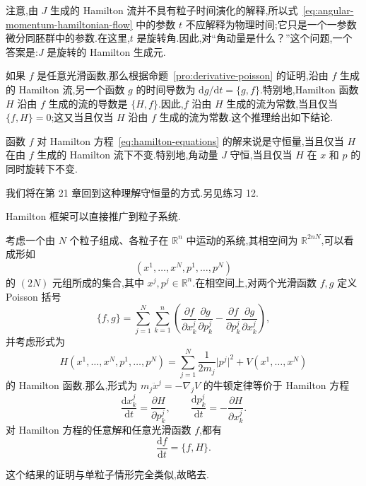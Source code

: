 注意,由 $J$ 生成的 Hamilton 流并不具有粒子时间演化的解释,所以式~\eqref{eq:angular-momentum-hamiltonian-flow} 中的参数 $t$ 不应解释为物理时间;它只是一个一参数微分同胚群中的参数.在这里,$t$ 是旋转角.因此,对“角动量是什么？”这个问题,一个答案是:$J$ 是旋转的 Hamilton 生成元.

如果 $f$ 是任意光滑函数,那么根据命题~\ref{pro:derivative-poisson} 的证明,沿由 $f$ 生成的 Hamilton 流,另一个函数 $g$ 的时间导数为 $\mathrm{d}g/\mathrm{d}t=\{g,f\}$.特别地,Hamilton 函数 $H$ 沿由 $f$ 生成的流的导数是 $\{H,f\}$.因此,$f$ 沿由 $H$ 生成的流为常数,当且仅当 $\{f,H\}=0$;这又当且仅当 $H$ 沿由 $f$ 生成的流为常数.这个推理给出如下结论.

\begin{conclusion}
函数 $f$ 对 Hamilton 方程~\eqref{eq:hamilton-equations} 的解来说是守恒量,当且仅当 $H$ 在由 $f$ 生成的 Hamilton 流下不变.特别地,角动量 $J$ 守恒,当且仅当 $H$ 在 $x$ 和 $p$ 的同时旋转下不变.
\end{conclusion}

我们将在第 21 章回到这种理解守恒量的方式.另见练习 12.

Hamilton 框架可以直接推广到粒子系统.

\begin{proposition}\label{pro:many-particle-hamiltonian}
考虑一个由 $N$ 个粒子组成、各粒子在 $\mathbb{R}^{n}$ 中运动的系统,其相空间为 $\mathbb{R}^{2nN}$,可以看成形如
\[
  (x^{1},\ldots,x^{N},p^{1},\ldots,p^{N})
\]
的 $(2N)$ 元组所成的集合,其中 $x^{j},p^{j}\in\mathbb{R}^{n}$.在相空间上,对两个光滑函数 $f,g$ 定义 Poisson 括号
\[
  \{f,g\}=\sum_{j=1}^{N}\sum_{k=1}^{n}\left(
  \frac{\partial f}{\partial x^{j}_{k}}\frac{\partial g}{\partial p^{j}_{k}}
  -\frac{\partial f}{\partial p^{j}_{k}}\frac{\partial g}{\partial x^{j}_{k}}\right),
\]
并考虑形式为
\[
  H(x^{1},\ldots,x^{N},p^{1},\ldots,p^{N})
  =\sum_{j=1}^{N}\frac{1}{2m_{j}}\lvert p^{j}\rvert^{2}+V(x^{1},\ldots,x^{N})
\]
的 Hamilton 函数.那么,形式为 $m_{j}\ddot{x}^{j}=-\nabla_{j}V$ 的牛顿定律等价于 Hamilton 方程
\begin{equation}
  \frac{\mathrm{d}x^{j}_{k}}{\mathrm{d}t}=\frac{\partial H}{\partial p^{j}_{k}},
  \qquad
  \frac{\mathrm{d}p^{j}_{k}}{\mathrm{d}t}=-\frac{\partial H}{\partial x^{j}_{k}}.
  \label{eq:many-particle-hamilton-equations}
\end{equation}
对 Hamilton 方程的任意解和任意光滑函数 $f$,都有
\[
  \frac{\mathrm{d}f}{\mathrm{d}t}=\{f,H\}.
\]
\end{proposition}

这个结果的证明与单粒子情形完全类似,故略去.

